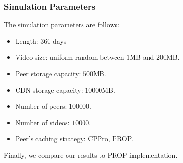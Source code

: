 \documentclass[10pt,final,journal,a4paper]{IEEEtran}
\begin{document}




\subsubsection{Simulation Parameters}
The simulation parameters are follows:

\begin{itemize}
\item Length: $360$ days.
\item Video size: uniform random between $1$MB and $200$MB.
\item Peer storage capacity: $500$MB.
\item CDN storage capacity: $10000$MB.
\item Number of peers: $100000$.
\item Number of videos: $10000$.
\item Peer's caching strategy: CPPro, PROP.
\end{itemize}
Finally, we compare our results to PROP \cite{1613869} implementation.
\end{document}
